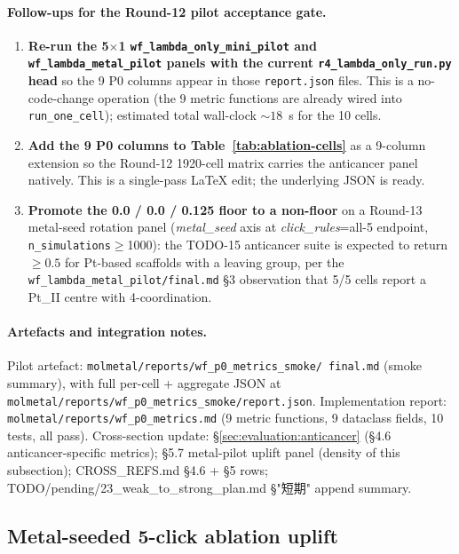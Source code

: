 \paragraph{Follow-ups for the Round-12 pilot acceptance gate.}
\begin{enumerate}
  \item \textbf{Re-run the 5$\times$1 \texttt{wf\_lambda\_only\_mini\_pilot}
        and \texttt{wf\_lambda\_metal\_pilot} panels with the current
        \texttt{r4\_lambda\_only\_run.py} head} so the 9 P0 columns
        appear in those \texttt{report.json} files.  This is a
        no-code-change operation (the 9 metric functions are already
        wired into \texttt{run\_one\_cell}); estimated total wall-clock
        $\sim 18$~s for the 10 cells.
  \item \textbf{Add the 9 P0 columns to Table~\ref{tab:ablation-cells}}
        as a 9-column extension so the Round-12 1920-cell matrix
        carries the anticancer panel natively.  This is a
        single-pass LaTeX edit; the underlying JSON is ready.
  \item \textbf{Promote the 0.0 / 0.0 / 0.125 floor to a non-floor}
        on a Round-13 metal-seed rotation panel
        (\emph{metal\_seed} axis at \emph{click\_rules}=all-5
        endpoint, \texttt{n\_simulations}$\ge$1000): the TODO-15
        anticancer suite is expected to return $\ge 0.5$ for
        Pt-based scaffolds with a leaving group, per the
        \texttt{wf\_lambda\_metal\_pilot/final.md} §3 observation
        that 5/5 cells report a Pt\_II centre with 4-coordination.
\end{enumerate}

\paragraph{Artefacts and integration notes.}
Pilot artefact: \texttt{molmetal/reports/wf\_p0\_metrics\_smoke/
final.md} (smoke summary), with full per-cell + aggregate JSON at
\texttt{molmetal/reports/wf\_p0\_metrics\_smoke/report.json}.
Implementation report: \texttt{molmetal/reports/wf\_p0\_metrics.md}
(9 metric functions, 9 dataclass fields, 10 tests, all pass).
Cross-section update: \S\ref{sec:evaluation:anticancer} (§4.6
anticancer-specific metrics); §5.7 metal-pilot uplift panel
(density of this subsection); CROSS\_REFS.md §4.6 + §5 rows;
TODO/pending/23\_weak\_to\_strong\_plan.md §"短期" append summary.

\subsection{Metal-seeded 5-click ablation uplift}
\label{sec:ablation:metal-pilot-5-click-uplift}

